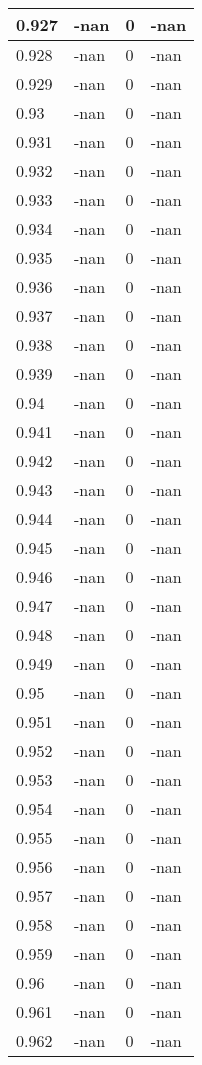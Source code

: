 \documentclass[a4paper,14pt]{extarticle}
\begin{document}
\begin{longtable}{||m{3cm}||m{3cm}|m{3cm}||m{3cm}||}
\hline
0.927 & -nan & 0 & -nan\\
\hline
0.928 & -nan & 0 & -nan\\
\hline
0.929 & -nan & 0 & -nan\\
\hline
0.93 & -nan & 0 & -nan\\
\hline
0.931 & -nan & 0 & -nan\\
\hline
0.932 & -nan & 0 & -nan\\
\hline
0.933 & -nan & 0 & -nan\\
\hline
0.934 & -nan & 0 & -nan\\
\hline
0.935 & -nan & 0 & -nan\\
\hline
0.936 & -nan & 0 & -nan\\
\hline
0.937 & -nan & 0 & -nan\\
\hline
0.938 & -nan & 0 & -nan\\
\hline
0.939 & -nan & 0 & -nan\\
\hline
0.94 & -nan & 0 & -nan\\
\hline
0.941 & -nan & 0 & -nan\\
\hline
0.942 & -nan & 0 & -nan\\
\hline
0.943 & -nan & 0 & -nan\\
\hline
0.944 & -nan & 0 & -nan\\
\hline
0.945 & -nan & 0 & -nan\\
\hline
0.946 & -nan & 0 & -nan\\
\hline
0.947 & -nan & 0 & -nan\\
\hline
0.948 & -nan & 0 & -nan\\
\hline
0.949 & -nan & 0 & -nan\\
\hline
0.95 & -nan & 0 & -nan\\
\hline
0.951 & -nan & 0 & -nan\\
\hline
0.952 & -nan & 0 & -nan\\
\hline
0.953 & -nan & 0 & -nan\\
\hline
0.954 & -nan & 0 & -nan\\
\hline
0.955 & -nan & 0 & -nan\\
\hline
0.956 & -nan & 0 & -nan\\
\hline
0.957 & -nan & 0 & -nan\\
\hline
0.958 & -nan & 0 & -nan\\
\hline
0.959 & -nan & 0 & -nan\\
\hline
0.96 & -nan & 0 & -nan\\
\hline
0.961 & -nan & 0 & -nan\\
\hline
0.962 & -nan & 0 & -nan\\

\end{longtable}
\end{document}

